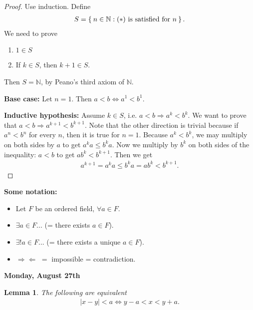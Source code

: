 \documentclass[12pt]{amsbook}
\theoremstyle{plain}
\numberwithin{section}{chapter}
\numberwithin{equation}{chapter}
\newtheorem{lem}[theorem]{Lemma}
\theoremstyle{definition}
\theoremstyle{remark}
\theoremstyle{plain}
\newcommand{\n}{\mathbb{N}}
\newcommand{\bee}{\begin{equation}\begin{aligned}}
\newcommand{\eee}{\end{aligned}\end{equation}}
\renewcommand{\leq}{\leqslant}
\begin{document}
\begin{proof}
Use induction. Define
\bee
S = \Set{n \in \n: (*) \text{ is satisfied for }n}. 
\eee
We need to prove
\begin{enumerate}[label=\roman*)]
\item $1 \in S$
\item If $k \in S$, then $k + 1 \in S$. 
\end{enumerate}
Then $S = \n$, by Peano's third axiom of $\n$. 

\textbf{Base case:} Let $n = 1$. Then $a < b \Leftrightarrow a^1 < b^1$. 

\textbf{Inductive hypothesis:} Assume $k \in S$, i.e. $a < b \Rightarrow a^k < b^k$. We want to prove that $a < b \Rightarrow a^{k + 1} < b^{k + 1}$. Note that the other direction is trivial because if $a^n < b^n$ for every $n$, then it is true for $n = 1$. Because $a^k < b^k$, we may multiply on both sides by $a$ to get $a^ka \leq  b^ka$. Now we multiply by $b^k$ on both sides of the inequality: $a < b$ to get $ab^k < b^{k + 1}$. Then we get
\bee
 a^{k + 1} = a^ka  \leq b^ka = ab^k < b^{k + 1}. 
\eee
\end{proof}

\textbf{Some notation:}
\begin{itemize}
\item Let $F$ be an ordered field, $\forall a \in F$. 
\item $\exists a \in F$... (= there exists $a \in F$). 
\item $\exists! a \in F$... (= there exists a unique $a \in F$). 
\item $\Rightarrow\Leftarrow$ $ = $ impossible = contradiction.
\end{itemize}


\textbf{Monday, August 27th}

\begin{lem}
The following are equivalent
\bee
|x - y| < a \Leftrightarrow y - a < x < y + a. 
\eee
\end{lem}
\end{document}
